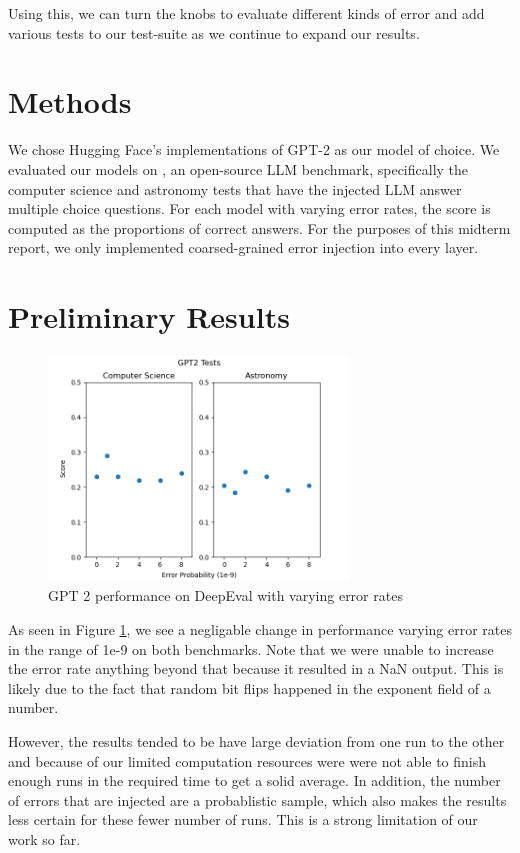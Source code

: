 \documentclass[a4paper]{article}
\begin{document}
Using this, we can turn the knobs to evaluate different kinds of error and add various tests to our test-suite as we continue to expand our results.

\section{Methods}

We chose Hugging Face's implementations of GPT-2 \cite{gpt2} as our model of choice. We evaluated our models on \cite{DeepEval}, an open-source LLM benchmark, specifically the computer science and astronomy tests that have the injected LLM answer multiple choice questions. For each model with varying error rates, the score is computed as the proportions of correct answers. For the purposes of this midterm report, we only implemented coarsed-grained error injection into every layer.


\section{Preliminary Results}
\begin{figure}[ht]
	\begin{center}
		\includegraphics[height=6cm]{gpt2.png}
		\caption{GPT 2 performance on DeepEval with varying error rates}
		\label{gpt2-res}
	\end{center}
\end{figure}

As seen in Figure \ref{gpt2-res}, we see a negligable change in performance varying error rates in the range of 1e-9 on both benchmarks. Note that we were unable to increase the error rate anything beyond that because it resulted in a NaN output. This is likely due to the fact that random bit flips happened in the exponent field of a number.

However, the results tended to be have large deviation from one run to the other and because of our limited computation resources were were not able to finish enough runs in the required time to get a solid average. In addition, the number of errors that are injected are a probablistic sample, which also makes the results less certain for these fewer number of runs. This is a strong limitation of our work so far.
\end{document}
